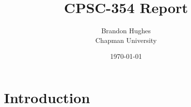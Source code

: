\documentclass{article}
\title{CPSC-354 Report}
\author{Brandon Hughes \\ Chapman University}
\date{\today}
\theoremstyle{theorem}
\theoremstyle{definition}
\theoremstyle{remark}
\begin{document}
\maketitle

\begin{abstract}
\end{abstract}

\setcounter{tocdepth}{3}
\tableofcontents

\section{Introduction}\label{intro}



\end{document}
